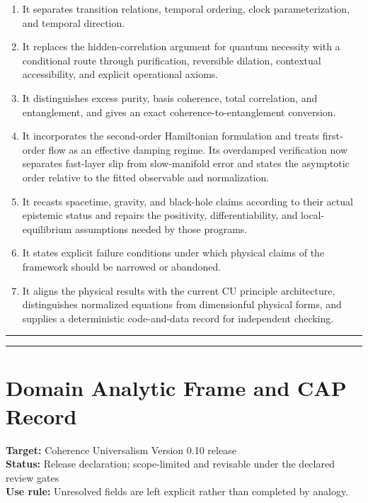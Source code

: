 \documentclass[
  11pt,
]{article}
\begin{document}
\begin{enumerate}
  \(\|\operatorname{grad}_F S\|_F\), and \(\Pi_F\) on the closed
  four-state simplex.
\item
  It separates transition relations, temporal ordering, clock
  parameterization, and temporal direction.
\item
  It replaces the hidden-correlation argument for quantum necessity with
  a conditional route through purification, reversible dilation,
  contextual accessibility, and explicit operational axioms.
\item
  It distinguishes excess purity, basis coherence, total correlation,
  and entanglement, and gives an exact coherence-to-entanglement
  conversion.
\item
  It incorporates the second-order Hamiltonian formulation and treats
  first-order flow as an effective damping regime. Its overdamped
  verification now separates fast-layer slip from slow-manifold error
  and states the asymptotic order relative to the fitted observable and
  normalization.
\item
  It recasts spacetime, gravity, and black-hole claims according to
  their actual epistemic status and repairs the positivity,
  differentiability, and local-equilibrium assumptions needed by those
  programs.
\item
  It states explicit failure conditions under which physical claims of
  the framework should be narrowed or abandoned.
\item
  It aligns the physical results with the current CU principle
  architecture, distinguishes normalized equations from dimensionful
  physical forms, and supplies a deterministic code-and-data record for
  independent checking.
\end{enumerate}

\begin{center}\rule{0.5\linewidth}{0.5pt}\end{center}

\begin{center}\rule{0.5\linewidth}{0.5pt}\end{center}

\section{Domain Analytic Frame and CAP
Record}\label{domain-analytic-frame-and-cap-record}

\textbf{Target:} Coherence Universalism Version 0.10 release\\
\textbf{Status:} Release declaration; scope-limited and revisable under
the declared review gates\\
\textbf{Use rule:} Unresolved fields are left explicit rather than
completed by analogy.
\end{document}
